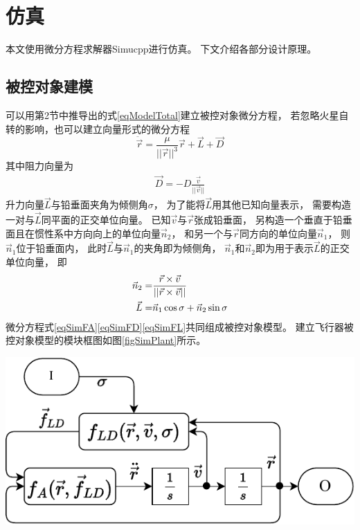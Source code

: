 \section{仿真}
本文使用微分方程求解器Simucpp\cite{olzhn2021}进行仿真。
下文介绍各部分设计原理。

\subsection{被控对象建模}
可以用第2节中推导出的式\eqref{eqModelTotal}建立被控对象微分方程，
若忽略火星自转的影响，也可以建立向量形式的微分方程
\begin{equation}
    \ddot{\vec{r}} = \frac{\mu}{||\vec{r}||^3}\vec{r}+\vec{L}+\vec{D} \label{eqSimFA}
\end{equation}
其中阻力向量为
\begin{align}
    \vec{D} = -D\frac{\vec{v}}{||\vec{v}||} \label{eqSimFD}
\end{align}
升力向量$\vec{L}$与铅垂面夹角为倾侧角$\sigma$，
为了能将$\vec{L}$用其他已知向量表示，
需要构造一对与$\vec{L}$同平面的正交单位向量。
已知$\vec{v}$与$\vec{r}$张成铅垂面，
另构造一个垂直于铅垂面且在惯性系中方向向上的单位向量$\vec{n}_2$，
和另一个与$\vec{r}$同方向的单位向量$\vec{n}_1$，
则$\vec{n}_1$位于铅垂面内，
此时$\vec{L}$与$\vec{n}_1$的夹角即为倾侧角，
$\vec{n}_1$和$\vec{n}_2$即为用于表示$\vec{L}$的正交单位向量，
即
\begin{align}
    \vec{n}_2 =& \frac{\vec{r}\times\vec{v}}{||\vec{r}\times\vec{v}||} \notag\\
    \vec{L} =& \vec{n}_1\cos\sigma + \vec{n}_2\sin\sigma \label{eqSimFL}
\end{align}
微分方程式\eqref{eqSimFA}\eqref{eqSimFD}\eqref{eqSimFL}共同组成被控对象模型。
建立飞行器被控对象模型的模块框图如图\ref{figSimPlant}所示。
\begin{center}
	\includegraphics[scale=0.8]{plant.pdf}  \\
	\label{figSimPlant}
\end{center}
